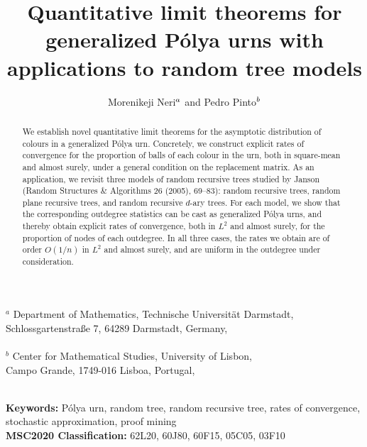 \documentclass[12pt]{amsart}
\theoremstyle{definition}
\theoremstyle{remark}
\begin{document}
\title[Quantitative limit theorems for generalized 
P\'olya urns]{Quantitative limit theorems for generalized 
P\'olya urns with applications to random tree models}

\author[Morenikeji Neri and Pedro Pinto]{Morenikeji Neri${}^{\MakeLowercase a}$ and Pedro Pinto${}^{\MakeLowercase b}$}
\maketitle

\vspace*{-5mm}
\begin{center}
{\scriptsize 
${}^a$ Department of Mathematics, Technische Universit\"at Darmstadt,\\
Schlossgartenstra\ss{}e 7, 64289 Darmstadt, Germany,\\ 
\\
${}^b$ Center for Mathematical Studies, University of Lisbon,\\
Campo Grande, 1749-016 Lisboa, Portugal,\\
\\}
\end{center}

\begin{abstract}
We establish novel quantitative limit theorems for the asymptotic distribution 
of colours in a generalized P\'olya urn. Concretely, we construct explicit rates 
of convergence for the proportion of balls of each colour in the urn, both in 
square-mean and almost surely, under a general condition on the replacement 
matrix. As an application, we revisit three models of random recursive trees 
studied by Janson (Random Structures \& Algorithms 26 (2005), 69--83): random 
recursive trees, random plane recursive trees, and random recursive $d$-ary 
trees. For each model, we show that the corresponding outdegree statistics can 
be cast as generalized P\'olya urns, and thereby obtain explicit rates of 
convergence, both in $L^2$ and almost surely, for the proportion of nodes of 
each outdegree. In all three cases, the rates we obtain are of order $O(1/n)$ 
in $L^2$ and almost surely, and are uniform in the outdegree under consideration.
\end{abstract}
\noindent
{\bf Keywords:}  P\'olya urn, random tree, random recursive tree, rates of convergence, stochastic approximation, proof mining\\ 
{\bf MSC2020 Classification:} 62L20, 60J80, 60F15, 05C05, 03F10
\end{document}
